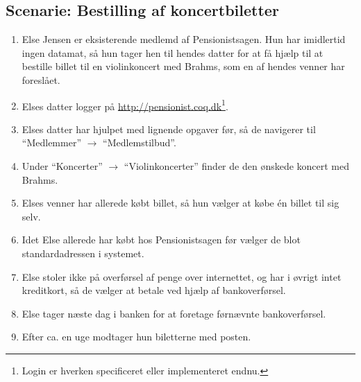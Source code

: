 \subsection{Scenarie: Bestilling af koncertbiletter}

\begin{enumerate}
    \item Else Jensen er eksisterende medlemd af Pensionistsagen. Hun har
          imidlertid ingen datamat, så hun tager hen til hendes datter for at
          få hjælp til at bestille billet til en violinkoncert med Brahms,
          som en af hendes venner har foreslået.
    \item Elses datter logger på
          \url{http://pensionist.coq.dk}\footnote{Login er hverken
          specificeret eller implementeret endnu.}.
    \item Elses datter har hjulpet med lignende opgaver før, så de navigerer
          til ``Medlemmer'' $\to$ ``Medlemstilbud''.
    \item Under ``Koncerter'' $\to$ ``Violinkoncerter'' finder de den ønskede
          koncert med Brahms.
    \item Elses venner har allerede købt billet, så hun vælger at købe én
          billet til sig selv.
    \item Idet Else allerede har købt hos Pensionistsagen før vælger de blot
          standardadressen i systemet.
    \item Else stoler ikke på overførsel af penge over internettet, og
          har i øvrigt intet kreditkort, så de vælger at betale ved hjælp
          af bankoverførsel.
    \item Else tager næste dag i banken for at foretage førnævnte
          bankoverførsel.
    \item Efter ca. en uge modtager hun biletterne med posten.
\end{enumerate}
